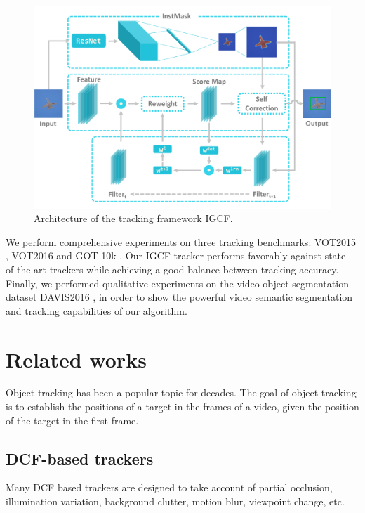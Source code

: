 \documentclass[review]{elsarticle}
\begin{document}
\begin{CJK*}{UTF8}{gbsn}
\begin{figure}
    \centering
    \includegraphics[width=12cm]{images/instmask1.pdf}
    \caption{Architecture of the tracking framework IGCF.}
    \label{fig:IGCF}
\end{figure}

We perform comprehensive experiments on three tracking benchmarks: VOT2015 \cite{Kristan2015TheVO}, VOT2016 \cite{Kristan2016TheVO} and GOT-10k \cite{Huang2018GOT10kAL}. Our IGCF tracker performs favorably against state-of-the-art trackers while achieving a good balance between tracking accuracy. Finally, we performed qualitative experiments on the video object segmentation dataset DAVIS2016 \cite{Perazzi2016}, in order to show the powerful video semantic segmentation and tracking capabilities of our algorithm.

\section{Related works}
Object tracking has been a popular topic for decades. The goal of object tracking is to establish the positions of a target in the frames of a video, given the position of the target in the first frame.

\subsection{DCF-based trackers}
Many DCF based trackers are designed to take account of partial occlusion, illumination variation, background clutter, motion blur, viewpoint change, etc.


\end{CJK*}
\end{document}

